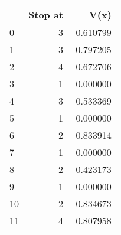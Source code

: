 \begin{tabular}{lrr}
\toprule
{} &  Stop at &      V(x) \\
\midrule
0  &        3 &  0.610799 \\
1  &        3 & -0.797205 \\
2  &        4 &  0.672706 \\
3  &        1 &  0.000000 \\
4  &        3 &  0.533369 \\
5  &        1 &  0.000000 \\
6  &        2 &  0.833914 \\
7  &        1 &  0.000000 \\
8  &        2 &  0.423173 \\
9  &        1 &  0.000000 \\
10 &        2 &  0.834673 \\
11 &        4 &  0.807958 \\
\bottomrule
\end{tabular}
